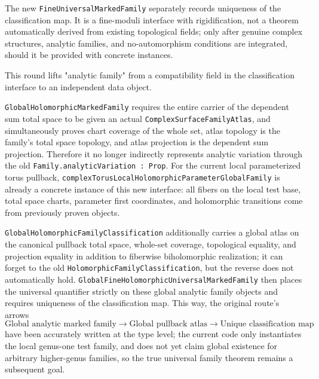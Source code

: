 \documentclass[UTF8,a4paper,11pt]{article}
\begin{document}
The new \texttt{FineUniversalMarkedFamily} separately records uniqueness of the classification map. It is a fine-moduli interface with rigidification, not a theorem automatically derived from existing topological fields; only after genuine complex structures, analytic families, and no-automorphism conditions are integrated, should it be provided with concrete instances.

This round lifts "analytic family" from a compatibility field in the classification interface to an independent data object.
\par
\texttt{Global\allowbreak Holomorphic\allowbreak Marked\allowbreak Family} requires the entire carrier of the dependent sum total space to be given an actual
\texttt{ComplexSurfaceFamily\allowbreak Atlas}, and simultaneously proves chart coverage of the whole set, atlas topology is the family's total space topology, and atlas projection is the dependent sum projection. Therefore it no longer indirectly represents analytic variation through the old
\texttt{Family.analyticVariation : Prop}. For the current local parameterized torus pullback,
\texttt{complexTorusLocalHolomorphicParameter\allowbreak Global\allowbreak Family} is already a concrete instance of this new interface:
all fibers on the local test base, total space charts, parameter first coordinates, and holomorphic transitions come from previously proven objects.

\texttt{GlobalHolomorphic\allowbreak Family\allowbreak Classification} additionally carries
a global atlas on the canonical pullback total space, whole-set coverage, topological equality, and projection equality in addition to fiberwise biholomorphic realization; it can forget to the old
\texttt{HolomorphicFamily\allowbreak Classification}, but the reverse does not automatically hold. \texttt{GlobalFineHolomorphicUniversal\allowbreak Marked\allowbreak Family} then places the universal quantifier strictly on these global analytic family objects and requires uniqueness of the classification map. This way, the original route's arrows
\[
  \text{Global analytic marked family}\longrightarrow\text{Global pullback atlas}\longrightarrow\text{Unique classification map}
\]
have been accurately written at the type level; the current code only instantiates the local genus-one test family, and does not yet claim global existence for arbitrary higher-genus families, so the true universal family theorem remains a subsequent goal.
\end{document}
